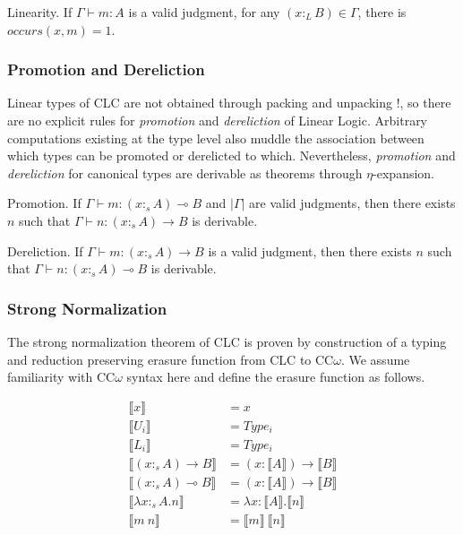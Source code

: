 \documentclass[sigplan,screen,review,anonymous]{acmart}
\newcommand{\pure}[1]{|#1|}
\newcommand{\ltype}{:_{\scriptscriptstyle L}}
\newcommand{\stype}[1]{:_#1}
\newcommand{\erase}[1]{\llbracket #1 \rrbracket}
\begin{document}
\begin{theorem}
  Linearity. If $\Gamma \vdash m : A$ is a valid judgment, for any $(x \ltype B) \in \Gamma$, there is $occurs(x, m) = 1$.
\end{theorem}

\subsubsection{Promotion and Dereliction}
Linear types of CLC are not obtained through packing and unpacking !, so there are no explicit rules for \textit{promotion} and \textit{dereliction} of Linear Logic. Arbitrary computations existing at the type level also muddle the association between which types can be promoted or derelicted to which. Nevertheless, \textit{promotion} and \textit{dereliction} for canonical types are derivable as theorems through $\eta$-expansion.

\begin{theorem}
  Promotion. If $\Gamma \vdash m : (x \stype{s} A) \multimap B$ and $\pure{\Gamma}$ are valid judgments, then there exists $n$ such that $\Gamma \vdash n : (x \stype{s} A) \rightarrow B$ is derivable.
\end{theorem}

\begin{theorem}
  Dereliction. If $\Gamma \vdash m : (x \stype{s} A) \rightarrow B$ is a valid judgment, then there exists $n$ such that $\Gamma \vdash n : (x \stype{s} A) \multimap B$ is derivable.
\end{theorem}

\subsubsection{Strong Normalization}
The strong normalization theorem of CLC is proven by construction of a typing and reduction preserving erasure function from CLC to CC$\omega$. We assume familiarity with CC$\omega$ syntax here and define the erasure function as follows.

\begin{definition}
  \begin{align*}
    \erase{x}                             & = x                                     \\
    \erase{U_i}                           & = Type_i                                \\
    \erase{L_i}                           & = Type_i                                \\
    \erase{(x \stype{s} A) \rightarrow B} & = (x : \erase{A}) \rightarrow \erase{B} \\
    \erase{(x \stype{s} A) \multimap B}   & = (x : \erase{A}) \rightarrow \erase{B} \\
    \erase{\lambda x\stype{s}A.n}         & = \lambda x : \erase{A}.\erase{n}       \\
    \erase{m\ n}                          & = \erase{m}\ \erase{n}
  \end{align*}
\end{definition}
\end{document}
